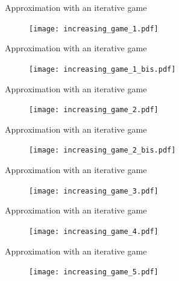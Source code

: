 \documentclass[10pt,aspectratio=169]{beamer}
\begin{document}
\begin{frame}{Approximation with an iterative game}
    \begin{figure}
        \texttt{[image: increasing\_game\_1.pdf]}
    \end{figure}
\end{frame}

\begin{frame}{Approximation with an iterative game}
    \begin{figure}
        \texttt{[image: increasing\_game\_1\_bis.pdf]}
    \end{figure}
\end{frame}

\begin{frame}{Approximation with an iterative game}
    \begin{figure}
        \texttt{[image: increasing\_game\_2.pdf]}
    \end{figure}
\end{frame}

\begin{frame}{Approximation with an iterative game}
    \begin{figure}
        \texttt{[image: increasing\_game\_2\_bis.pdf]}
    \end{figure}
\end{frame}

\begin{frame}{Approximation with an iterative game}
    \begin{figure}
        \texttt{[image: increasing\_game\_3.pdf]}
    \end{figure}
\end{frame}

\begin{frame}{Approximation with an iterative game}
    \begin{figure}
        \texttt{[image: increasing\_game\_4.pdf]}
    \end{figure}
\end{frame}

\begin{frame}{Approximation with an iterative game}
    \begin{figure}
        \texttt{[image: increasing\_game\_5.pdf]}
    \end{figure}
\end{frame}


\end{document}
